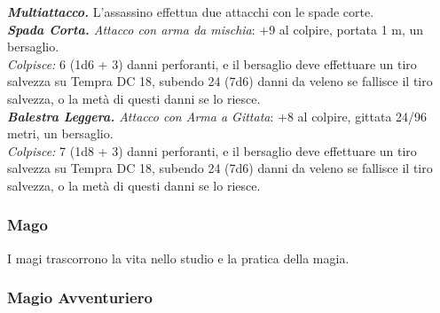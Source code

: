 \begin{multicols}{2}
\emph{\textbf{Multiattacco.}} L'assassino effettua due attacchi con le spade corte.\\
\emph{\textbf{Spada Corta.} Attacco con arma da mischia}: +9 al colpire, portata 1 m, un bersaglio.\\
\emph{Colpisce:} 6 (1d6 + 3) danni perforanti, e il bersaglio deve effettuare un tiro salvezza su Tempra DC  18, subendo 24 (7d6) danni da veleno se fallisce il tiro salvezza, o la metà di questi danni se lo riesce.\\

\emph{\textbf{Balestra Leggera.} Attacco con Arma a Gittata}: +8 al colpire, gittata 24/96 metri, un bersaglio. \\
\emph{Colpisce:} 7 (1d8 + 3) danni perforanti, e il bersaglio deve effettuare un tiro salvezza su Tempra DC  18, subendo 24 (7d6) danni da veleno se fallisce il tiro salvezza, o la metà di questi danni se lo riesce.\\

\subsubsection{Mago}

I magi trascorrono la vita nello studio e la pratica della magia.\\

\subsubsection{Magio Avventuriero}


\end{multicols}
